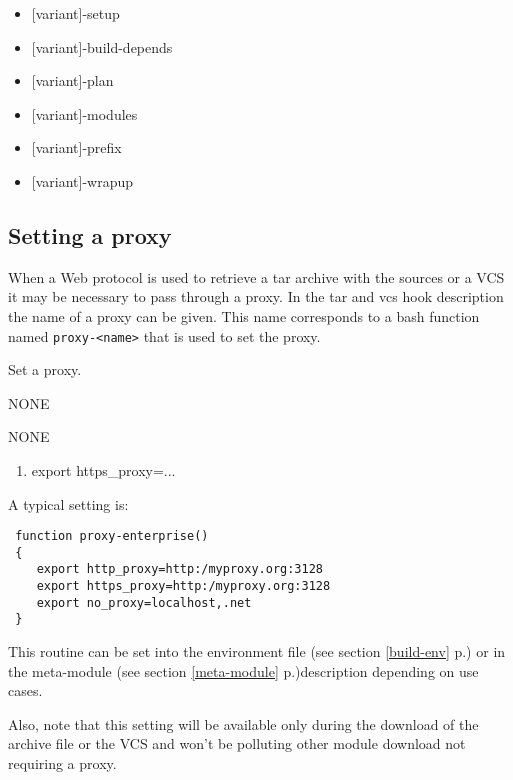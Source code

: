\documentclass[a4paper,12pt,twoside]{article}
\newcommand{\code}[1]{\texttt{#1}}
\newcommand{\seeref}[1]{see section \ref{#1} p.\pageref{#1}}
\begin{document}
\begin{itemize}[font=\texttt]
	\item {[variant]-setup}
	\item {[variant]-build-depends}
	\item {[variant]-plan}
	\item {[variant]-modules}
	\item {[variant]-prefix}
	\item {[variant]-wrapup}
\end{itemize}

\subsection{Setting a proxy}
\label{proxy}

When a Web protocol is used to retrieve a tar archive with the sources or a VCS it may be necessary to pass through a proxy. In the tar and vcs hook description the name of a proxy can be given. This name corresponds to a bash function named \code{proxy-<name>} that is used to set the proxy.

\begin{description}[style=nextline]
	\item[proxy-<name>] Set a proxy.
	\begin{description}[font=\textit,style=standard]
		\item[parameter] \tabto{2cm} NONE
		\item[return] \tabto{2cm} NONE
		\begin{enumerate}
			\item export https\_proxy=...
		\end{enumerate}
	\end{description}
\end{description}

A typical setting is:

\begin{lstlisting}
 function proxy-enterprise()
 {
    export http_proxy=http:/myproxy.org:3128
    export https_proxy=http:/myproxy.org:3128
    export no_proxy=localhost,.net
 }
\end{lstlisting}

This routine can be set into the environment file (\seeref{build-env}) or in the meta-module (\seeref{meta-module})description depending on use cases.

Also, note that this setting will be available only during the download of the archive file or the VCS and won't be polluting other module download not requiring a proxy.
\end{document}

